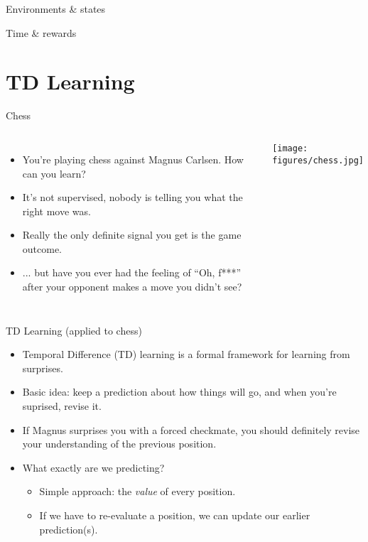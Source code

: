 \documentclass{beamer}
\begin{document}
\begin{frame}{Environments \& states}

\end{frame}

\begin{frame}{Time \& rewards}
\end{frame}

\section{TD Learning}
\begin{frame}{Chess}
\begin{columns}
\begin{itemize}
    \item<1-> You're playing chess against Magnus Carlsen. How can you learn?
    \item<2-> It's not supervised, nobody is telling you what the right move was.
    \item<3-> Really the only definite signal you get is the game outcome.
    \item<4-> ... but have you ever had the feeling of ``Oh, f***'' after your opponent makes a move you didn't see?
\end{itemize}
    \begin{center}
    \texttt{[image: figures/chess.jpg]}
    \end{center}
\end{columns}
\end{frame}

\begin{frame}{TD Learning (applied to chess)}
\begin{itemize}
    \item<1-> Temporal Difference (TD) learning is a formal framework for learning from surprises. 
    \item<2-> Basic idea: keep a prediction about how things will go, and when you're suprised, revise it. 
    \item<3-> If Magnus surprises you with a forced checkmate, you should definitely revise your understanding of the previous position.
    \item<4-> What exactly are we predicting? 
    \begin{itemize}
        \item<5-> Simple approach: the \emph{value} of every position.
        \item<6-> If we have to re-evaluate a position, we can update our earlier prediction(s).
    \end{itemize}
\end{itemize}
\end{frame}
\end{document}
